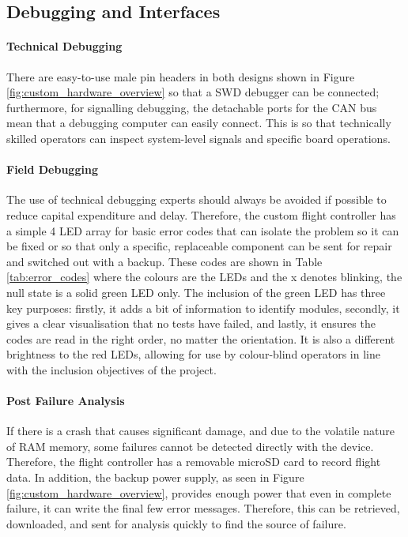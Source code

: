 \subsection{Debugging and Interfaces}\label{sub_sub_section:debugging}
\paragraph{Technical Debugging}
There are easy-to-use male pin headers in both designs shown in Figure \ref{fig:custom_hardware_overview} so that a \gls{SWD} debugger can be connected; furthermore, for signalling debugging, the detachable ports for the \gls{CAN} bus mean that a debugging computer can easily connect. This is so that technically skilled operators can inspect system-level signals and specific board operations.
\paragraph{Field Debugging}
The use of technical debugging experts should always be avoided if possible to reduce capital expenditure and delay. Therefore, the custom flight controller has a simple 4 \gls{LED} array for basic error codes that can isolate the problem so it can be fixed or so that only a specific, replaceable component can be sent for repair and switched out with a backup. These codes are shown in Table \ref{tab:error_codes} where the colours are the \gls{LED}s and the x denotes blinking, the null state is a solid green \gls{LED} only.  The inclusion of the green LED has three key purposes: firstly, it adds a bit of information to identify modules, secondly, it gives a clear visualisation that no tests have failed, and lastly, it ensures the codes are read in the right order, no matter the orientation. It is also a different brightness to the red \gls{LED}s, allowing for use by colour-blind operators in line with the inclusion objectives of the project.

\paragraph{Post Failure Analysis}
If there is a crash that causes significant damage, and due to the volatile nature of \gls{RAM} memory, some failures cannot be detected directly with the device. Therefore, the flight controller has a removable microSD card to record flight data. In addition, the backup power supply, as seen in Figure \ref{fig:custom_hardware_overview}, provides enough power that even in complete failure, it can write the final few error messages. Therefore, this can be retrieved, downloaded, and sent for analysis quickly to find the source of failure.
